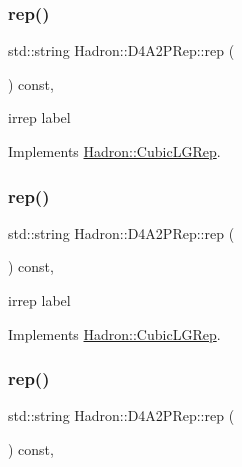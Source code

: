 \subsubsection{\texorpdfstring{rep()}{rep()}\hspace{0.1cm}{\footnotesize\ttfamily [1/3]}}
{\footnotesize\ttfamily std\+::string Hadron\+::\+D4\+A2\+P\+Rep\+::rep (\begin{DoxyParamCaption}{ }\end{DoxyParamCaption}) const\hspace{0.3cm}{\ttfamily [inline]}, {\ttfamily [virtual]}}

irrep label 

Implements \mbox{\hyperlink{structHadron_1_1CubicLGRep_a50f5ddbb8f4be4cee0106fa9e8c75e6c}{Hadron\+::\+Cubic\+L\+G\+Rep}}.

\mbox{\label{structHadron_1_1D4A2PRep_a0d17ee51770f635eb312b9da22dd1c1f}} 
\subsubsection{\texorpdfstring{rep()}{rep()}\hspace{0.1cm}{\footnotesize\ttfamily [2/3]}}
{\footnotesize\ttfamily std\+::string Hadron\+::\+D4\+A2\+P\+Rep\+::rep (\begin{DoxyParamCaption}{ }\end{DoxyParamCaption}) const\hspace{0.3cm}{\ttfamily [inline]}, {\ttfamily [virtual]}}

irrep label 

Implements \mbox{\hyperlink{structHadron_1_1CubicLGRep_a50f5ddbb8f4be4cee0106fa9e8c75e6c}{Hadron\+::\+Cubic\+L\+G\+Rep}}.

\mbox{\label{structHadron_1_1D4A2PRep_a0d17ee51770f635eb312b9da22dd1c1f}} 
\subsubsection{\texorpdfstring{rep()}{rep()}\hspace{0.1cm}{\footnotesize\ttfamily [3/3]}}
{\footnotesize\ttfamily std\+::string Hadron\+::\+D4\+A2\+P\+Rep\+::rep (\begin{DoxyParamCaption}{ }\end{DoxyParamCaption}) const\hspace{0.3cm}{\ttfamily [inline]}, {\ttfamily [virtual]}}

